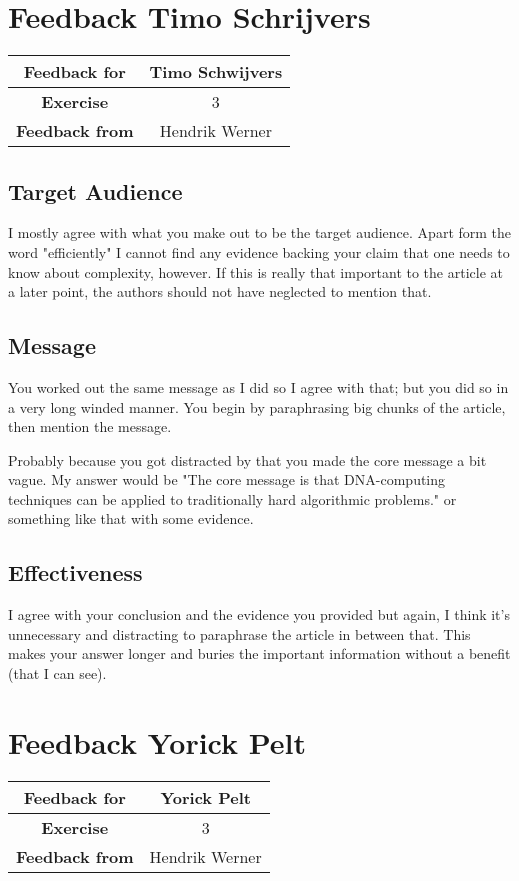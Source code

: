 \documentclass[12pt, a4paper]{article}
\begin{document}
\clearpage
\section{Feedback Timo Schrijvers}
\begin{tabular}{|c|c|}
	\hline
	\textbf{Feedback for} & Timo Schwijvers\\\hline
	\textbf{Exercise} & 3\\\hline
	\textbf{Feedback from} & Hendrik Werner\\\hline
\end{tabular}

\subsection{Target Audience}
I mostly agree with what you make out to be the target audience. Apart form the word "efficiently" I cannot find any evidence backing your claim that one needs to know about complexity, however. If this is really that important to the article at a later point, the authors should not have neglected to mention that.

\subsection{Message}
You worked out the same message as I did so I agree with that; but you did so in a very long winded manner. You begin by paraphrasing big chunks of the article, then mention the message.

Probably because you got distracted by that you made the core message a bit vague. My answer would be "The core message is that DNA-computing techniques can be applied to traditionally hard algorithmic problems." or something like that with some evidence.

\subsection{Effectiveness}
I agree with your conclusion and the evidence you provided but again, I think it's unnecessary and distracting to paraphrase the article in between that. This makes your answer longer and buries the important information without a benefit (that I can see).

\clearpage
\section{Feedback Yorick Pelt}
\begin{tabular}{|c|c|}
	\hline
	\textbf{Feedback for} & Yorick Pelt\\\hline
	\textbf{Exercise} & 3\\\hline
	\textbf{Feedback from} & Hendrik Werner\\\hline
\end{tabular}
\end{document}
